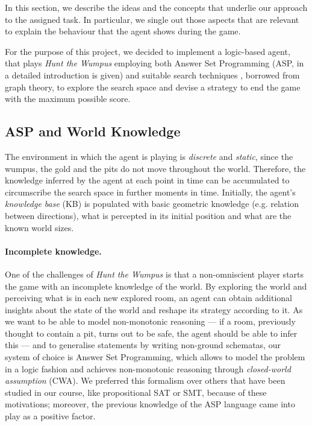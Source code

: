 \documentclass{llncs}
\newcommand{\htw}{\emph{Hunt the Wumpus }}
\begin{document}
In this section, we describe the ideas and the concepts that underlie our approach to the assigned task.
In particular, we single out those aspects that are relevant to explain the behaviour that the agent shows during the game.

For the purpose of this project, we decided to implement a logic-based agent, that plays \htw employing both Answer Set Programming (ASP, in~\cite{ASPprimer} a detailed introduction is given) and suitable search techniques , borrowed from graph theory, to explore the search space and devise a strategy to end the game with the maximum possible score.

\subsection{ASP and World Knowledge}

The environment in which the agent is playing is \emph{discrete} and \emph{static}, since the wumpus, the gold and the pits do not move throughout the world.
Therefore, the knowledge inferred by the agent at each point in time can be accumulated to circumscribe the search space in further moments in time.
Initially, the agent's \emph{knowledge base} (KB) is populated with basic geometric knowledge (e.g. relation between directions), what is percepted in its initial position and what are the known world sizes.

\paragraph{Incomplete knowledge.} One of the challenges of \htw is that a non-omniscient player starts the game with an incomplete knowledge of the world.
By exploring the world and perceiving what is in each new explored room, an agent can obtain additional insights about the state of the world and reshape its strategy according to it.
As we want to be able to model non-monotonic reasoning --- if a room, previously thought to contain a pit, turns out to be safe, the agent should be able to infer this --- and to generalise statements by writing non-ground schematas, our system of choice is Answer Set Programming, which allows to model the problem in a logic fashion and achieves non-monotonic reasoning through \emph{closed-world assumption} (CWA).
We preferred this formalism over others that have been studied in our course, like propositional SAT or SMT, because of these motivations; moreover, the previous knowledge of the ASP language came into play as a positive factor.
\end{document}
